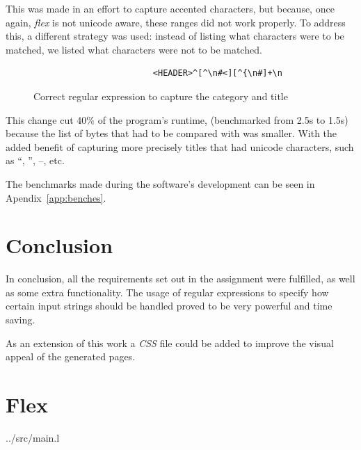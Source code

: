 \documentclass[a4paper]{report}
\begin{document}
This was made in an effort to capture accented characters, but because, once
again, \textit{flex} is not unicode aware, these ranges did not work properly.
To address this, a different strategy was used: instead of listing what
characters were to be matched, we listed what characters were not to be
matched.

\begin{figure}[H]
    \centering
    \begin{verbatim}
                        <HEADER>^[^\n#<][^{\n#]+\n
    \end{verbatim}
    \caption{Correct regular expression to capture the category and title}\label{fig:new-regex}
\end{figure}

This change cut 40\% of the program's runtime, (benchmarked from 2.5s to 1.5s)
because the list of bytes that had to be compared with was smaller. With the
added benefit of capturing more precisely titles that had unicode characters,
such as  ``,  '', --, etc.

The benchmarks made during the software's development can be seen in Apendix~\ref{app:benches}.


\chapter{Conclusion}

In conclusion, all the requirements set out in the assignment were fulfilled, as
well as some extra functionality. The usage of regular expressions to specify
how certain input strings should be handled proved to be very powerful and time
saving.

As an extension of this work a \textit{CSS} file could be added to
improve the visual appeal of the generated pages.

\appendix

\chapter{Flex}


{../src/main.l}
\end{document}
